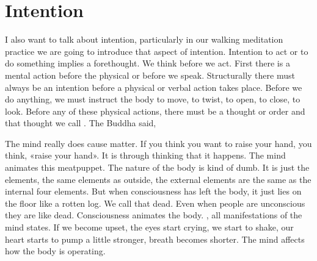 \documentclass[letterpaper,10pt,english]{sphinxmanual}
\begin{document}
\section{Intention}
\label{\detokenize{4-a:intention}}
\sphinxAtStartPar
I also want to talk about intention, particularly in our walking meditation practice we are going to introduce that aspect of intention. Intention to
act or to do something implies a forethought. We think before we act. First
there is a mental action before the physical or before we speak. Structurally
there must always be an intention before a physical or verbal action takes
place. Before we do anything, we must instruct the body to move, to twist,
to open, to close, to look. Before any of these physical actions, there must
be a thought or order and that thought we call
. The Buddha said,

\sphinxAtStartPar
The  mind  really  does  cause  matter.  If  you  think  you  want  to  raise
your hand, you think, «raise your hand». It is through thinking that it happens. The mind animates this meat\sphinxhyphen{}puppet. The nature of the body is kind
of dumb. It is just the elements, the same elements as outside, the external
elements  are  the  same  as  the  internal  four  elements.  But  when  consciousness has left the body, it just lies on the floor like a rotten log. We call that
dead. Even when people are unconscious they are like dead. Consciousness
animates the body.
, all manifestations of the mind
states. If we become upset, the eyes start crying, we start to shake, our heart
starts to pump a little stronger, breath becomes shorter. The mind affects how
the body is operating.
\end{document}
